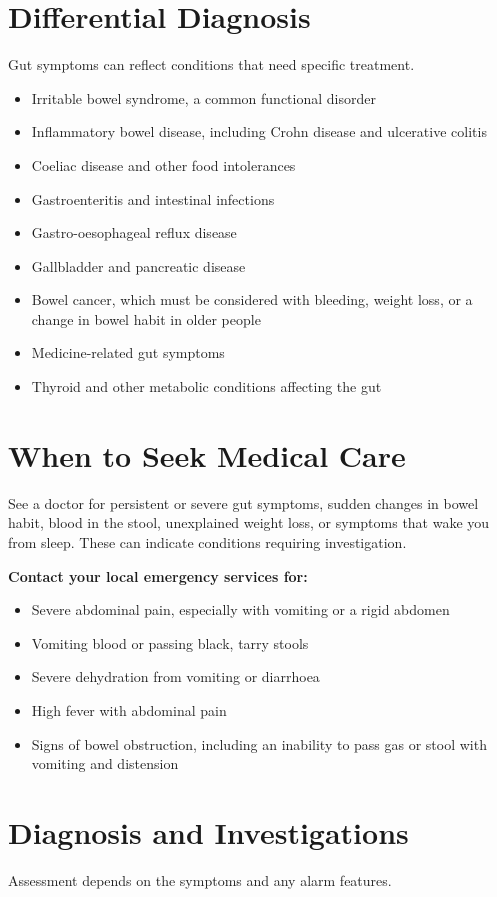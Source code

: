 \section*{Differential Diagnosis}
Gut symptoms can reflect conditions that need specific treatment.

\begin{itemize}
    \item Irritable bowel syndrome, a common functional disorder
    \item Inflammatory bowel disease, including Crohn disease and ulcerative colitis
    \item Coeliac disease and other food intolerances
    \item Gastroenteritis and intestinal infections
    \item Gastro-oesophageal reflux disease
    \item Gallbladder and pancreatic disease
    \item Bowel cancer, which must be considered with bleeding, weight loss, or a change in bowel habit in older people
    \item Medicine-related gut symptoms
    \item Thyroid and other metabolic conditions affecting the gut
\end{itemize}

\section*{When to Seek Medical Care}
See a doctor for persistent or severe gut symptoms, sudden changes in bowel habit, blood in the stool, unexplained weight loss, or symptoms that wake you from sleep. These can indicate conditions requiring investigation.

\textbf{Contact your local emergency services for:}
\begin{itemize}
    \item Severe abdominal pain, especially with vomiting or a rigid abdomen
    \item Vomiting blood or passing black, tarry stools
    \item Severe dehydration from vomiting or diarrhoea
    \item High fever with abdominal pain
    \item Signs of bowel obstruction, including an inability to pass gas or stool with vomiting and distension
\end{itemize}

\section*{Diagnosis and Investigations}
Assessment depends on the symptoms and any alarm features.

